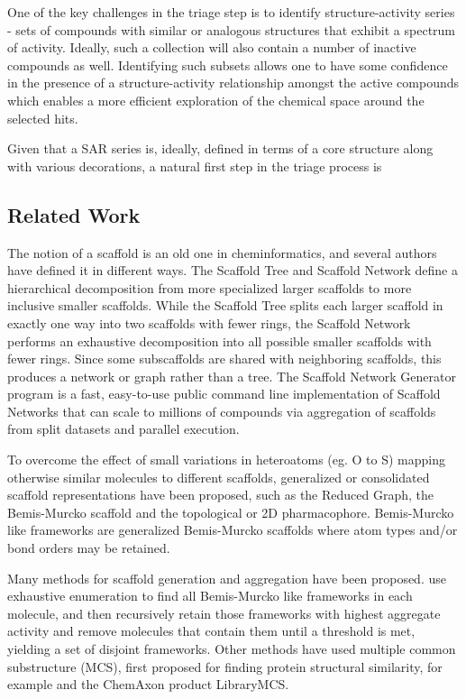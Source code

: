 \documentclass[journal=jacsat,manuscript=article]{achemso}
\begin{document}
One of the key challenges in the triage step is to identify structure-activity series - sets of compounds with similar or analogous structures that exhibit a spectrum of activity. Ideally, such a collection will also contain a number of inactive compounds as well. Identifying such subsets allows one to have some confidence in the presence of a structure-activity relationship amongst the active compounds which enables a more efficient exploration of the chemical space around the selected hits.

Given that a SAR series is, ideally, defined in terms of a core structure along with various decorations, a natural first step in the triage process is 

\subsection{Related Work}
The notion of a scaffold is an old one in cheminformatics, and several authors \cite{ScaffoldRefs} have defined it in different ways. The Scaffold Tree\cite{Ertl2011ScaffoldTree} and Scaffold Network\cite{Varin2011ScafNet} define a hierarchical decomposition from more specialized larger scaffolds to more inclusive smaller scaffolds. While the Scaffold Tree splits each larger scaffold in exactly one way into two scaffolds with fewer rings, the Scaffold Network performs an exhaustive decomposition into all possible smaller scaffolds with fewer rings.  Since some subscaffolds are shared with neighboring scaffolds, this produces a network or graph rather than a tree. The Scaffold Network Generator program\cite{Matlock2013SNG} is a fast, easy-to-use public command line implementation of Scaffold Networks that can scale to millions of compounds via aggregation of scaffolds from split datasets and parallel execution. 

To overcome the effect of small variations in heteroatoms (eg. O to S) mapping 
otherwise similar molecules to different scaffolds, generalized or consolidated scaffold representations have been proposed, such as the Reduced Graph\cite{Barker2003RG}, the Bemis-Murcko scaffold\cite{BemisMurcko1996} and the topological or 2D pharmacophore\cite{Schneider1999ScafHopTP}. Bemis-Murcko like frameworks \cite{Harper2004DDclus} are generalized Bemis-Murcko scaffolds where atom types and/or bond orders may be retained.    

Many methods for scaffold generation and aggregation have been proposed.  \citeauthor{Harper2004DDclus} use exhaustive enumeration to find all Bemis-Murcko like frameworks in each molecule, and then recursively retain those frameworks with highest aggregate activity and remove molecules that contain them until a threshold is met, yielding a set of disjoint frameworks.   Other methods have used multiple common substructure (MCS), first proposed for finding protein structural similarity\cite{Koch1997MCSprot}, for example \cite{Quintus2009MCS} and the ChemAxon product LibraryMCS. 
\end{document}
